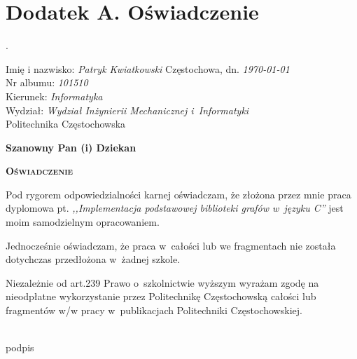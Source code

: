 \documentclass[a4paper,12pt,polish,twoside,openright]{thesis}
\begin{document}

\chapter*{Dodatek A. Oświadczenie}
\newlength{\oldparskip}
\setlength{\oldparskip}{\parskip}
\setlength{\parindent}{0pt}.
\setlength{\parskip}{0.3cm}

Imię i nazwisko: \emph{Patryk Kwiatkowski} \hfill Częstochowa, dn. \emph{\today} \\
Nr albumu: \emph{101510} \\
Kierunek: \emph{Informatyka} \\
Wydział: \emph{Wydział Inżynierii Mechanicznej i~Informatyki} \\

\vfill
Politechnika Częstochowska
\vfill
\begin{flushright}
\textbf{Szanowny Pan (i) Dziekan} \hspace*{1cm}
\end{flushright}
\vfill
\begin{center}
\textbf{\textsc{\large Oświadczenie}}
\end{center}
\vfill

Pod rygorem odpowiedzialności karnej oświadczam, że złożona przez mnie praca dyplomowa pt. \emph{,,Implementacja podstawowej biblioteki grafów w~języku C''} jest moim samodzielnym opracowaniem.

Jednocześnie oświadczam, że praca w~całości lub we fragmentach nie została dotychczas przedłożona w~żadnej szkole.

Niezależnie od art.239 Prawo o~szkolnictwie wyższym wyrażam zgodę na nieodpłatne wykorzystanie przez Politechnikę Częstochowską całości lub fragmentów w/w pracy w~publikacjach Politechniki Częstochowskiej.

\vfill

\begin{center}
	\begin{minipage}{0.7\textwidth}
		\begin{flushright}
		\begin{minipage}{0.4\textwidth}
			\begin{center}
			\dotfill\\
			podpis
			\end{center}
		\end{minipage}
		\end{flushright}
	\end{minipage}
\end{center}
\end{document}
